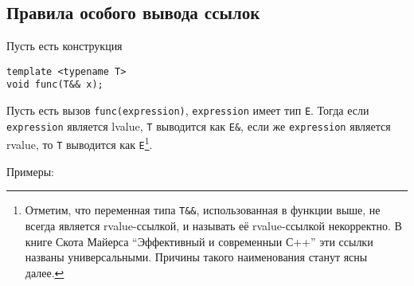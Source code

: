 \subsection{Правила особого вывода ссылок}

Пусть есть конструкция

\begin{verbatim}
template <typename T>
void func(T&& x);
\end{verbatim}

Пусть есть вызов \texttt{func(expression)}, \texttt{expression} имеет тип \texttt{E}. Тогда если \texttt{expression} является lvalue, \texttt{T} выводится как \texttt{E&}, если же \texttt{expression} является rvalue, то \texttt{T} выводится как \texttt{E}\footnote{%
	Отметим, что переменная типа \texttt{T&&}, использованная в функции выше, не всегда является rvalue-ссылкой, и называть её rvalue-ссылкой некорректно. В книге Скота Майерса “Эффективный и современныи С++” эти ссылки названы универсальными. Причины такого наименования станут ясны далее.}.

Примеры:


